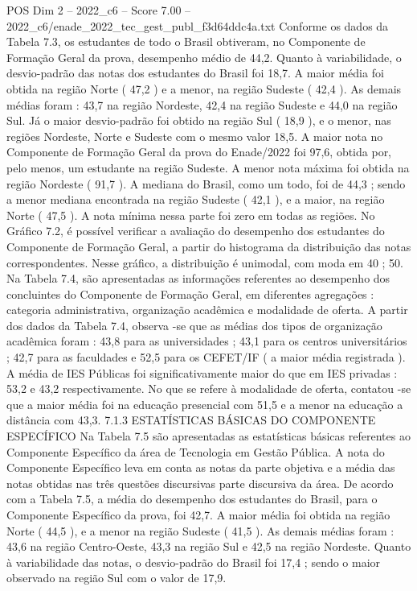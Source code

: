 \begin{textsample}{POS Dim 2 – 2022\_c6 – Score 7.00 – 2022\_c6/enade\_2022\_tec\_gest\_publ\_f3d64ddc4a.txt}
Conforme os dados da Tabela 7.3, os estudantes de todo o Brasil obtiveram, no Componente de Formação Geral da prova, desempenho médio de 44,2.
Quanto à variabilidade, o desvio-padrão das notas dos estudantes do Brasil foi 18,7.
A maior média foi obtida na região Norte ( 47,2 ) e a menor, na região Sudeste ( 42,4 ).
As demais médias foram : 43,7 na região Nordeste, 42,4 na região Sudeste e 44,0 na região Sul.
Já o maior desvio-padrão foi obtido na região Sul ( 18,9 ), e o menor, nas regiões Nordeste, Norte e Sudeste com o mesmo valor 18,5.
A maior nota no Componente de Formação Geral da prova do Enade/2022 foi 97,6, obtida por, pelo menos, um estudante na região Sudeste.
A menor nota máxima foi obtida na região Nordeste ( 91,7 ).
A mediana do Brasil, como um todo, foi de 44,3 ; sendo a menor mediana encontrada na região Sudeste ( 42,1 ), e a maior, na região Norte ( 47,5 ).
A nota mínima nessa parte foi zero em todas as regiões.
No Gráfico 7.2, é possível verificar a avaliação do desempenho dos estudantes do Componente de Formação Geral, a partir do histograma da distribuição das notas correspondentes.
Nesse gráfico, a distribuição é unimodal, com moda em 40 ; 50.
Na Tabela 7.4, são apresentadas as informações referentes ao desempenho dos concluintes do Componente de Formação Geral, em diferentes agregações : categoria administrativa, organização acadêmica e modalidade de oferta.
A partir dos dados da Tabela 7.4, observa -se que as médias dos tipos de organização acadêmica foram : 43,8 para as universidades ; 43,1 para os centros universitários ; 42,7 para as faculdades e 52,5 para os CEFET/IF ( a maior média registrada ).
A média de IES Públicas foi significativamente maior do que em IES privadas : 53,2 e 43,2 respectivamente.
No que se refere à modalidade de oferta, contatou -se que a maior média foi na educação presencial com 51,5 e a menor na educação a distância com 43,3. 7.1.3 ESTATÍSTICAS BÁSICAS DO COMPONENTE ESPECÍFICO Na Tabela 7.5 são apresentadas as estatísticas básicas referentes ao Componente Específico da área de Tecnologia em Gestão Pública.
A nota do Componente Específico leva em conta as notas da parte objetiva e a média das notas obtidas nas três questões discursivas parte discursiva da área.
De acordo com a Tabela 7.5, a média do desempenho dos estudantes do Brasil, para o Componente Específico da prova, foi 42,7.
A maior média foi obtida na região Norte ( 44,5 ), e a menor na região Sudeste ( 41,5 ).
As demais médias foram : 43,6 na região Centro-Oeste, 43,3 na região Sul e 42,5 na região Nordeste.
Quanto à variabilidade das notas, o desvio-padrão do Brasil foi 17,4 ; sendo o maior observado na região Sul com o valor de 17,9.

\end{textsample}
